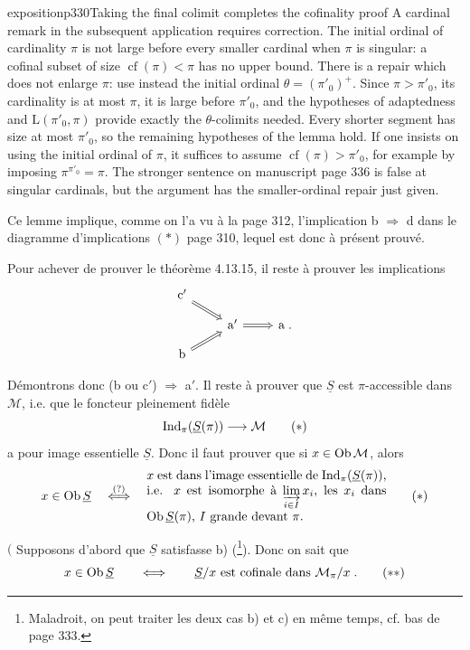 \begin{dcomment}{exposition}{p330}{Taking the final colimit completes the cofinality proof}
A cardinal remark in the subsequent application requires correction. The initial ordinal of cardinality $\pi$ is not large before every smaller cardinal when $\pi$ is singular: a cofinal subset of size $\operatorname{cf}(\pi)<\pi$ has no upper bound. There is a repair which does not enlarge $\pi$: use instead the initial ordinal $\theta=(\pi'_0)^+$. Since $\pi>\pi'_0$, its cardinality is at most $\pi$, it is large before $\pi'_0$, and the hypotheses of adaptedness and $\mathrm L(\pi'_0,\pi)$ provide exactly the $\theta$-colimits needed. Every shorter segment has size at most $\pi'_0$, so the remaining hypotheses of the lemma hold. If one insists on using the initial ordinal of $\pi$, it suffices to assume $\operatorname{cf}(\pi)>\pi'_0$, for example by imposing $\pi^{\pi'_0}=\pi$. The stronger sentence on manuscript page 336 is false at singular cardinals, but the argument has the smaller-ordinal repair just given.
\end{dcomment}


Ce lemme implique, comme on l'a vu à la page 312, l'implication b $\Longrightarrow$ d dans le diagramme d'implications $(*)$ page 310, lequel est donc à présent prouvé.

Pour achever de prouver le théorème 4.13.15, il reste à prouver les implications
\[
\begin{tikzcd}[row sep=small]
\mathrm{c}' \arrow[dr, Rightarrow] & & \\
& \mathrm{a}' \arrow[r, Rightarrow] & \mathrm{a} \; . \\
\mathrm{b} \arrow[ur, Rightarrow] & &
\end{tikzcd}
\]

Démontrons donc (b ou c$'$) $\Longrightarrow$ a$'$. Il reste à prouver que $\underline{S}$ est $\pi$-accessible dans $\mathcal{M}$, i.e. que le foncteur pleinement fidèle
\[
\operatorname{Ind}_\pi(\underline{S}(\pi)) \longrightarrow \mathcal{M} \tag*{$(*)$}
\]
a pour image essentielle $\underline{S}$. Donc il faut prouver que si $x \in \operatorname{Ob}\mathcal{M}$, alors
\[
x \in \Ob\underline{S} \quad \overset{(?)}{\Longleftrightarrow} \quad
\begin{minipage}[c]{0.55\textwidth}
$x$ est dans l'image essentielle de $\Ind_\pi(\underline{S}(\pi))$, i.e. $x$ est isomorphe à $\varinjlim\limits_{i\in I} x_i$, les $x_i$ dans $\Ob\underline{S}(\pi)$, $I$ grande devant $\pi$.
\end{minipage}
\tag*{$(*)$}
\]


$\Bigg($ Supposons d'abord que $\underline{S}$ satisfasse b) (\footnote[141]{Maladroit, on peut traiter les deux cas b) et c) en même temps, cf. bas de page 333.}). Donc on sait que
\[
x \in \operatorname{Ob}\underline{S} \qquad \Longleftrightarrow \qquad \underline{S}/x \text{ est cofinale dans } \mathcal{M}_\pi/x \; . \tag*{$(**)$}
\]

